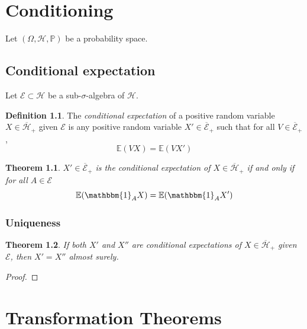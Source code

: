 \documentclass[11pt, a4paper, openany]{book}
\newtheorem{thm}{Theorem}\newtheorem{lem}{Lemma}\newtheorem{crl}{Corollary}
\theoremstyle{definition}
\newtheorem{define}{Definition}\newtheorem{exam}{Example}\newtheorem{remark}{Remark}
\begin{document}
\chapter{Conditioning}
    Let $(\Omega,\mathscr{H},\mathbb{P})$ be a probability space.
\section{Conditional expectation}
    Let $\mathscr{E}\subset\mathscr{H}$ be a sub-$\sigma$-algebra of $\mathscr{H}$.
    \begin{define}
        The \textit{conditional expectation} of a positive random variable $X\in\overline{\mathscr{H}}_+$ given $\mathscr{E}$ is any positive random variable $X'\in \overline{\mathscr{E}}_+$ such that for all $V\in \overline{\mathscr{E}}_+$,
        \[
            \mathbb{E}(V X)=\mathbb{E}(V X')
        \]
    \end{define}
    \begin{thm}
        $X'\in \overline{\mathscr{E}}_+$ is the conditional expectation of $X\in\overline{\mathscr{H}}_+$ if and only if for all $A\in\mathscr{E}$
        \[
            \mathbb{E}(\mathbbm{1}_AX)=\mathbb{E}(\mathbbm{1}_AX')
        \]
    \end{thm}
\subsection{Uniqueness}
    \begin{thm}
        If both $X'$ and $X''$ are conditional expectations of $X\in\overline{\mathscr{H}}_+$ given $\mathscr{E}$, then $X'=X''$ almost surely.
    \end{thm}
    \begin{proof}
        
    \end{proof}
\chapter{Transformation Theorems}
\end{document}
